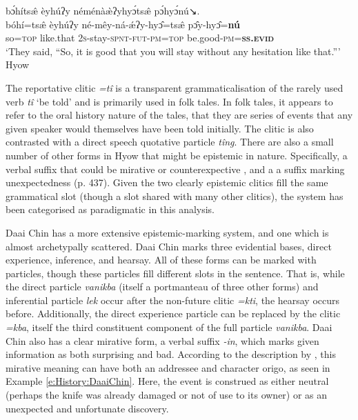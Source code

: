 \begin{exe}
\ex\label{e:History:Hyow}
\glll bɔ́hítsæ̂ èyhúʔy néménàæ̀ʔyhyɔ́tsæ̂ pɔ́hyɔ́nú↘. \\
bóhí=tsæ̂ èyhúʔy né-mêy-ná-ǽʔy-hyɔ̂=tsæ̂ pɔ̂y-hyɔ̂=\textbf{nú} \\
so=\textsc{top} like.that \textsc{2s}-stay-\textsc{spnt-fut-pm=top} be.good\textsc{-pm=\textbf{ss.evid}} \\
\glt `They said, ``So, it is good that you will stay without any hesitation like that.''' Hyow \cite[Kukish: Myanmar,][487]{Zakaria2018}
\end{exe}

The reportative clitic \textit{=tî} is a transparent grammaticalisation of the rarely used verb \textit{tî} `be told' and is primarily used in folk tales. In folk tales, it appears to refer to the oral history nature of the tales, that they are series of events that any given speaker would themselves have been told initially. The clitic is also contrasted with a direct speech quotative particle \textit{tîng}. There are also a small number of other forms in Hyow that might be epistemic in nature. Specifically, a verbal suffix that could be mirative or counterexpective \cite[440]{Zakaria2018}, and a a suffix marking unexpectedness (p. 437). Given the two clearly epistemic clitics fill the same grammatical slot (though a slot shared with many other clitics), the system has been categorised as paradigmatic in this analysis.

Daai Chin \cite[Kukish: Myanmar,][294]{SoHartmann2009} has a more extensive epistemic-marking system, and one which is almost archetypally scattered. Daai Chin marks three evidential bases, direct experience, inference, and hearsay. All of these forms can be marked with particles, though these particles fill different slots in the sentence. That is, while the direct particle \textit{vanikba} (itself a portmanteau of three other forms) and inferential particle \textit{lek} occur after the non-future clitic \textit{=kti}, the hearsay occurs before. Additionally, the direct experience particle can be replaced by the clitic \textit{=kba}, itself the third constituent component of the full particle \textit{vanikba}. Daai Chin also has a clear mirative form, a verbal suffix \textit{-in}, which marks given information as both surprising and bad. According to the description by , this mirative meaning can have both an addressee and character origo, as seen in Example \ref{e:History:DaaiChin}. Here, the event is construed as either neutral (perhaps the knife was already damaged or not of use to its owner) or as an unexpected and unfortunate discovery.

